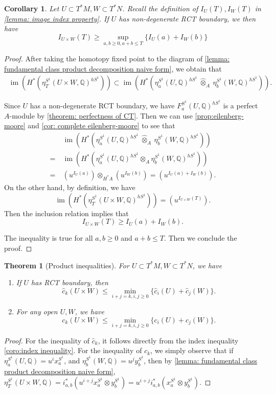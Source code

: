 \documentclass[11pt]{amsart}
\numberwithin{equation}{section}
\theoremstyle{plain}
\newtheorem{Thm}{Theorem}[section]
\newtheorem{Coro}[coro]{Corollary}
\theoremstyle{definition}
\theoremstyle{remark}
\newcommand{\bQ} { {\mathbb{Q}}}
\newcommand\im{ {\operatorname{im}} }
\begin{document}
\begin{Coro}\label{coro:index inequality}Let $U \subset T^*M, W \subset T^*N$. Recall the definition of $I_U(T), I_W(T)$ in \autoref{lemma: image index property}. If $U$ has non-degenerate RCT boundary, we then have
\begin{equation}\label{eq: index inequality}I_{U\times W}(T)\geq \sup_{a,b\geq 0,a+b\leq T}\{I_U(a)+I_W(b)\}\end{equation}
\end{Coro}
\begin{proof}After taking the homotopy fixed point to the diagram of \autoref{lemma: fundamental class product decomposition naive form}, we obtain that 
\begin{align*}
   ~\im(H^*(\eta_T^{S^1}(U\times W,\bQ)^{hS^1}))
   \subset\im(H^*(\eta^{S^1}_a(U,\bQ)^{hS^1}~\widehat\otimes_{A} ~ \eta^{S^1}_b(W,\bQ)^{hS^1})).
\end{align*}


Since $U$ has a non-degenerate RCT boundary, we have $F^{S^1}_a(U,\bQ)^{hS^1}$ is a perfect $A$-module by \autoref{theorem: perfectness of CT}. Then
we can use \autoref{prop:eilenberg-moore} and \autoref{cor: complete eilenberg-moore} to see that
\begin{align*}
   ~&\im(H^*(\eta^{S^1}_a(U,\bQ)^{hS^1} ~\widehat{\otimes}_{A} ~ \eta^{S^1}_b(W,\bQ)^{hS^1}))\\
   = 
   ~&\im(H^*(\eta^{S^1}_a(U,\bQ)^{hS^1}\otimes_{A} \eta^{S^1}_b(W,\bQ)^{hS^1}))\\
   =~&(u^{I_U(a)}) \otimes_{H^*A} (u^{I_W(b)})=(u^{I_U(a)+I_W(b)}).
\end{align*}
On the other hand, by definition, we have 
\[\im(H^*(\eta_T^{S^1}(U\times W,\bQ)^{hS^1}))= (u^{I_{U\times W}(T)}).\]
Then the inclusion relation implies that
\[I_{U\times W}(T)\geq I_U(a)+I_W(b).\]

The inequality is true for all $a,b\geq 0$ and $a+b\leq T$. Then we conclude the proof.
\end{proof}

\begin{Thm}[Product inequalities]\label{thm: product inequality}For $U \subset T^*M,W \subset T^*N$, we have
\begin{enumerate}[fullwidth]
    \item If $U$ has RCT boundary, then \[    \widehat{c}_k(U \times W) \leq \min_{i+j=k, i,j\geq 0}\{\widehat{c}_i(U) + \widehat{c}_j(W)\}.\]
    \item For any open $U,W$, we have
\[ {c}_k(U \times W) \leq \min_{i+j=k, i,j\geq 0}\{ {c}_i(U) +  {c}_j(W)\}.\]
\end{enumerate}
\end{Thm}
\begin{proof}For the inequality of $\widehat{c}_k$, it follows directly from the index inequality \autoref{coro:index inequality}.
For the inequality of ${c}_k$, we simply observe that if $\eta^{S^1}_a(U,\bQ)=u^i x^{S^1}_a$, and $ \eta^{S^1}_b(W,\bQ)=u^j y^{S^1}_b$, then by \autoref{lemma: fundamental class product decomposition naive form}, $\eta^{S^1}_T(U\times W,\bQ) = i_{a,b}^*(u^{i+j} x^{S^1}_a \otimes y^{S^1}_b) = u^{i+j}i_{a,b}^*(x^{S^1}_a\otimes y^{S^1}_b)$.
\end{proof}
\end{document}
